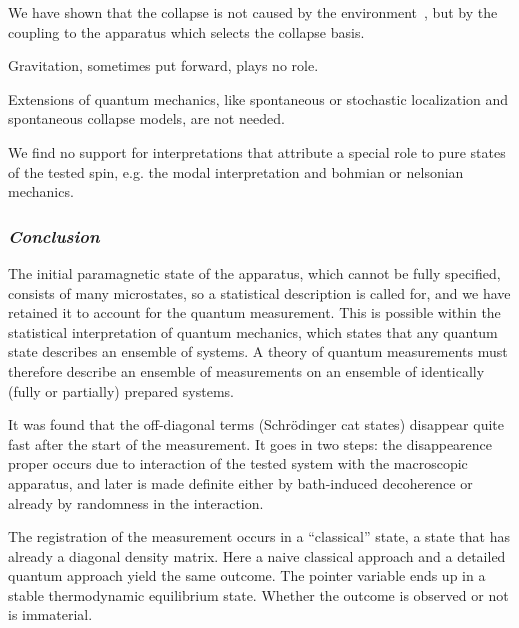\documentclass[12pt, onecolumn, aps,prb,floatfix]{revtex4-2}
\begin{document}
We have shown that the  collapse is not caused by the environment~\cite{Zurek}, 
but  by the coupling to the apparatus which selects the  collapse basis. 

Gravitation, sometimes put forward, plays no role.

Extensions of quantum mechanics, like spontaneous or stochastic 
localization and spontaneous  collapse models,  are not needed.


We find no support for interpretations that attribute a special role 
to pure states of the tested spin, e.g. the modal interpretation
and bohmian or nelsonian mechanics.


\subsubsection*{\it Conclusion}

The initial paramagnetic state of the apparatus, which cannot be fully specified, 
consists of many microstates, so a statistical description is called for, and we have 
retained it to account for the quantum measurement. This is 
possible within the statistical interpretation of quantum mechanics, which 
states that any quantum state describes an ensemble of systems.
A theory of quantum measurements must therefore describe an ensemble of measurements 
on an ensemble of identically (fully or partially) prepared systems.

It was found that the off-diagonal terms (Schr\"odinger cat states) disappear quite fast 
after the start of the measurement. It goes in two steps: the
disappearence proper occurs due to interaction 
of the tested system with the macroscopic apparatus, and later is made definite 
either by bath-induced decoherence or already by randomness in the interaction.


The registration of the measurement occurs in a ``classical'' state,
a state that has already a diagonal density matrix. 
Here a naive classical approach and a detailed quantum 
approach yield the same outcome. The pointer variable ends up in a 
stable thermodynamic equilibrium state. 
Whether the outcome is observed or not is immaterial.
\end{document}
